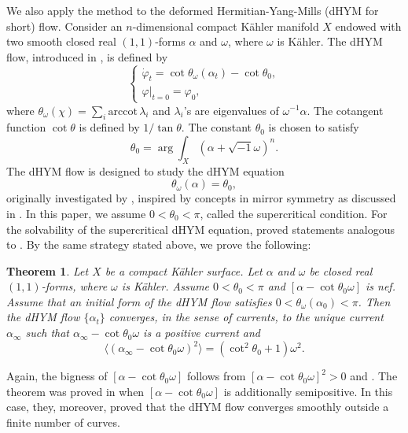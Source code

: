 \documentclass{amsart}
\numberwithin{equation}{section}
\theoremstyle{plain}
\newtheorem{thm}[equation]{Theorem}
\theoremstyle{definition}
\theoremstyle{remark}
\begin{document}
We also apply the method to the deformed Hermitian-Yang-Mills (dHYM for short) flow. Consider an $n$-dimensional compact K{\"a}hler manifold $X$ endowed with two smooth closed real $(1,1)$-forms $\alpha$ and $\omega$, where $\omega$ is K{\"a}hler. The dHYM flow, introduced in \cite{FYZ}, is defined by
\begin{equation}\label{eqdhymflow}
    \begin{cases}
        \dot{\varphi}_t=\cot{\theta_\omega(\alpha_t)}-\cot{\theta_0},\\
        \varphi|_{t=0}=\varphi_0,
    \end{cases}
\end{equation}
where $\theta_\omega(\chi)=\sum_i \mathrm{arccot}\, \lambda_i$ and $\lambda_i$'s are eigenvalues of $\omega^{-1}\alpha$. The cotangent function $\cot{\theta}$ is defined by $1/{\tan{\theta}}$.
The constant $\theta_0$ is chosen to satisfy
$$\theta_0=\arg{\int_X(\alpha+\sqrt{-1}\omega)^n}.$$
The dHYM flow is designed to study the dHYM equation
$${\theta_\omega(\alpha)}={\theta_0},$$
 originally investigated by \cite{JY}, inspired by concepts in mirror symmetry as discussed in \cite{LYZ}. 
 In this paper, we assume $0 <\theta_0 < \pi$, called the supercritical condition. For the solvability of the supercritical dHYM equation, \cite{GChen, CLT} proved statements analogous to \cite{GChen, Song}. By the same strategy stated above, we prove the following:
\begin{thm}\label{thmdHYMmain}
    Let $X$ be a compact K{\"a}hler surface. Let $\alpha$ and $\omega$ be closed real $(1,1)$-forms, where $\omega$ is K{\"a}hler. Assume $0<\theta_0<\pi$ and $[\alpha-\cot{\theta_0}\omega]$ is nef. Assume that an initial form of the dHYM flow satisfies $0<\theta_\omega(\alpha_0)<\pi$. Then the dHYM flow $\{\alpha_t\}$ converges, in the sense of currents, to the unique current $\alpha_\infty$ such that $\alpha_\infty-\cot{\theta_0}\omega$ is a positive current and
    \begin{equation*}
        \langle (\alpha_\infty-\cot{\theta_0}\omega)^2\rangle=(\cot^2{\theta_0}+1)\omega^2.
    \end{equation*}
\end{thm}

Again, the bigness of $[\alpha-\cot\theta_0\omega]$ follows from $[\alpha-\cot\theta_0\omega]^2>0$ and \cite[Theorem 0.5]{DP}.
The theorem was proved in \cite{FYZ} when $[\alpha-\cot{\theta_0}\omega]$ is additionally semipositive. In this case, they, moreover, proved that the dHYM flow converges smoothly outside a finite number of curves.
\end{document}
